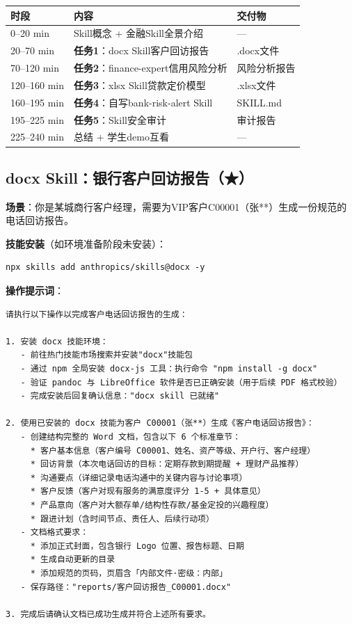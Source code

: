 \begin{table}[H]
\centering
\begin{tabular}{lp{5.5cm}l}
\toprule
\textbf{时段} & \textbf{内容} & \textbf{交付物} \\
\midrule
0--20 min & Skill概念 + 金融Skill全景介绍 & --- \\
20--70 min & \textbf{任务1}：docx Skill客户回访报告 & .docx文件 \\
70--120 min & \textbf{任务2}：finance-expert信用风险分析 & 风险分析报告 \\
120--160 min & \textbf{任务3}：xlsx Skill贷款定价模型 & .xlsx文件 \\
160--195 min & \textbf{任务4}：自写bank-risk-alert Skill & SKILL.md \\
195--225 min & \textbf{任务5}：Skill安全审计 & 审计报告 \\
225--240 min & 总结 + 学生demo互看 & --- \\
\bottomrule
\end{tabular}
\end{table}

\subsection{docx Skill：银行客户回访报告（★）}

\textbf{场景}：你是某城商行客户经理，需要为VIP客户C00001（张**）生成一份规范的电话回访报告。

\textbf{技能安装}（如环境准备阶段未安装）：

\begin{lstlisting}[style=shell]
npx skills add anthropics/skills@docx -y
\end{lstlisting}

\textbf{操作提示词}：

\begin{lstlisting}
请执行以下操作以完成客户电话回访报告的生成：

1. 安装 docx 技能环境：
   - 前往热门技能市场搜索并安装"docx"技能包
   - 通过 npm 全局安装 docx-js 工具：执行命令 "npm install -g docx"
   - 验证 pandoc 与 LibreOffice 软件是否已正确安装（用于后续 PDF 格式校验）
   - 完成安装后回复确认信息："docx skill 已就绪"

2. 使用已安装的 docx 技能为客户 C00001（张**）生成《客户电话回访报告》：
   - 创建结构完整的 Word 文档，包含以下 6 个标准章节：
     * 客户基本信息（客户编号 C00001、姓名、资产等级、开户行、客户经理）
     * 回访背景（本次电话回访的目标：定期存款到期提醒 + 理财产品推荐）
     * 沟通要点（详细记录电话沟通中的关键内容与讨论事项）
     * 客户反馈（客户对现有服务的满意度评分 1-5 + 具体意见）
     * 产品意向（客户对大额存单/结构性存款/基金定投的兴趣程度）
     * 跟进计划（含时间节点、责任人、后续行动项）
   - 文档格式要求：
     * 添加正式封面，包含银行 Logo 位置、报告标题、日期
     * 生成自动更新的目录
     * 添加规范的页码，页眉含「内部文件·密级：内部」
   - 保存路径："reports/客户回访报告_C00001.docx"

3. 完成后请确认文档已成功生成并符合上述所有要求。
\end{lstlisting}

